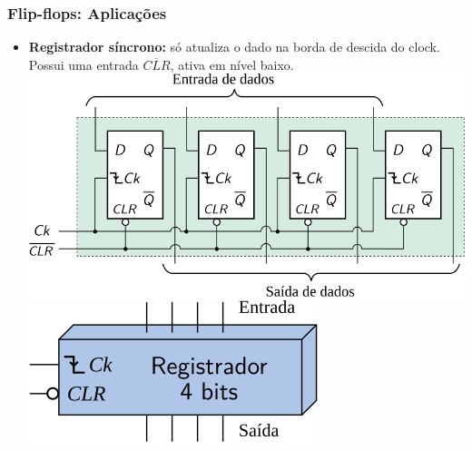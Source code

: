 \documentclass{beamer}
\newcommand{\Not}[1]{\overline{#1}}
\begin{document}
\begin{frame}
\frametitle{Flip-flops: Aplicações}

\begin{itemize}
\item \textbf{Registrador síncrono:} só atualiza o
dado na borda de descida do clock. Possui uma entrada $\Not{CLR}$,
ativa em nível baixo.\\[6pt]

\hspace{6ex}\includegraphics[scale=0.7]{images/sync_register}\pause\\[6pt]
\hspace*{\fill}\raisebox{24pt}{\Huge=}\hspace{6ex}\pause
\includegraphics[scale=0.9]{images/sync_register_blackbox}\hspace{3ex}

\end{itemize}

\end{frame}
\end{document}
